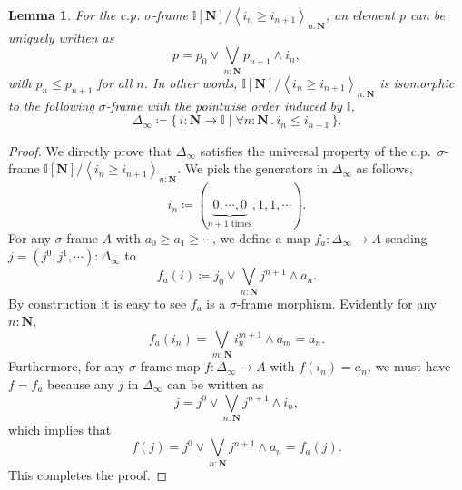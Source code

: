 \documentclass[12pt]{amsart}
\newtheorem{lemma}[theorem]{Lemma}
\theoremstyle{definition}
\newcommand{\mb}[1]{\mathbf{#1}}
\newcommand{\mbb}[1]{\mathbb{#1}}
\newcommand{\I}{\mbb I}
\newcommand{\pair}[1]{\left\langle#1\right\rangle}
\newcommand{\scomp}[2]{\{\,#1\mid#2\,\}}
\newcommand{\N}{\mb N}
\newcommand{\fa}[2]{\forall #1\!\colon\!\!#2\mathpunct{.}}
\begin{document}
\begin{lemma}\label{app:normalsigma}
  For the c.p. $\sigma$-frame $\I[\N]/\pair{i_n \ge i_{n+1}}_{n:\N}$, an element $p$ can be uniquely written as 
  \[ p = p_0 \vee \bigvee_{n:\N} p_{n+1} \wedge i_n, \]
  with $p_n \le p_{n+1}$ for all $n$. In other words, $\I[\N]/\pair{i_n \ge i_{n+1}}_{n:\N}$ is isomorphic to the following $\sigma$-frame with the pointwise order induced by $\I$,
  \[ \Delta_\infty \coloneq \scomp{i : \N \to \I}{\fa n\N i_n \le i_{n+1}}. \]
\end{lemma}
\begin{proof}
  We directly prove that $\Delta_\infty$ satisfies the universal property of the c.p.\ $\sigma$-frame $\I[\N]/\pair{i_n \ge i_{n+1}}_{n:\N}$. We pick the generators in $\Delta_\infty$ as follows,
  \[ i_n \coloneq (\underbrace{0,\cdots,0}_{n+1 \text{ times}},1,1,\cdots). \]
  For any $\sigma$-frame $A$ with $a_0 \ge a_1 \ge \cdots$, we define a map $f_a : \Delta_\infty \to A$ sending $j = (j^0,j^1,\cdots) : \Delta_\infty$ to
  \[ f_a(i) \coloneq j_0 \vee \bigvee_{n:\N} j^{n+1} \wedge a_{n}. \]
  By construction it is easy to see $f_a$ is a $\sigma$-frame morphism. Evidently for any $n : \N$, 
  \[ f_a(i_n) = \bigvee_{m:\N} i_n^{m+1} \wedge a_m = a_n. \]
  Furthermore, for any $\sigma$-frame map $f \colon \Delta_\infty \to A$ with $f(i_n) = a_n$, we must have $f = f_a$ because any $j$ in $\Delta_\infty$ can be written as
  \[ j = j^0 \vee \bigvee_{n:\N} j^{n+1} \wedge i_n, \]
  which implies that
  \[ f(j) = j^0 \vee \bigvee_{n:\N}j^{n+1} \wedge a_n = f_a(j). \]
  This completes the proof.
\end{proof}

\end{document}
